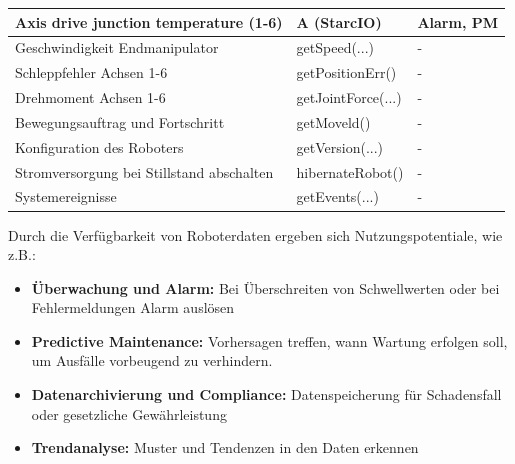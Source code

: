 \documentclass[ a4paper,
                oneside,
                toc=bibliography,
                toc=listof
                ]{scrbook}
\begin{document}
\begin{longtable}{|p{7cm}|p{3cm}|p{3cm}|}
		Axis drive junction temperature (1-6) & A (StarcIO) & Alarm, PM \\		
		\hline
		Geschwindigkeit Endmanipulator & getSpeed(...) & - \\
		Schleppfehler Achsen 1-6 & getPositionErr()  & - \\
		Drehmoment Achsen 1-6 & getJointForce(...)  & - \\
		Bewegungsauftrag und Fortschritt & getMoveld()  & - \\
		Konfiguration des Roboters & getVersion(...)  & - \\
		Stromversorgung bei Stillstand abschalten & hibernateRobot()  & - \\
		Systemereignisse &getEvents(...)  & - \\
			
	\end{longtable}
	Durch die Verfügbarkeit von Roboterdaten ergeben sich Nutzungspotentiale, wie z.B.:
	\begin{itemize}
		\item \textbf{Überwachung und Alarm:} Bei Überschreiten von Schwellwerten oder bei Fehlermeldungen Alarm auslösen
		\item \textbf{Predictive Maintenance:} Vorhersagen treffen, wann Wartung erfolgen soll, um Ausfälle vorbeugend zu verhindern.
		\item \textbf{Datenarchivierung und Compliance:} Datenspeicherung für Schadensfall oder gesetzliche Gewährleistung
		\item \textbf{Trendanalyse:} Muster und Tendenzen in den Daten erkennen
	\end{itemize}
	
\end{document}
